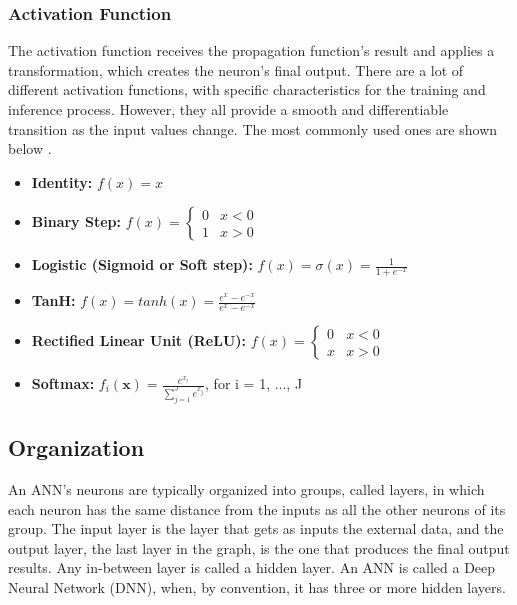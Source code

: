\subsubsection{Activation Function}
The activation function receives the propagation function's result and applies a transformation, which creates the neuron's final output. There are a lot of different activation functions, with specific characteristics for the training and inference process. However, they all provide a smooth and differentiable transition as the input values change. The most commonly used ones are shown below \cite{Activation-Function-Wikipedia}.
\begin{itemize}
	\item \textbf{Identity:} $f(x) = x$

	\item \textbf{Binary Step:} $
		      f(x) =
		      \begin{cases}
			      0 & x < 0 \\
			      1 & x > 0
		      \end{cases}
	      $

	\item \textbf{Logistic (Sigmoid or Soft step):} $
		      f(x) = \sigma(x) = \frac{1}{1 + e^{-x}}
	      $

	\item \textbf{TanH:} $
		      f(x) = tanh(x) = \frac{e^{x} - e^{-x}}{e^{x} - e^{-x}}
	      $

	\item \textbf{Rectified Linear Unit (ReLU):} $
		      f(x) =
		      \begin{cases}
			      0 & x < 0 \\
			      x & x > 0
		      \end{cases}
	      $

	\item \textbf{Softmax:} $
		      f_i(\textbf{x}) = \frac{
		      e^{x_i}
		      }{
		      \sum_{j=1}^{J}e^{x_j}
		      }
	      $, for i = 1, ..., J
\end{itemize}

\subsection{Organization}
An ANN's neurons are typically organized into groups, called layers, in which each neuron has the same distance from the inputs as all the other neurons of its group. The input layer is the layer that gets as inputs the external data, and the output layer, the last layer in the graph, is the one that produces the final output results. Any in-between layer is called a hidden layer. An ANN is called a Deep Neural Network (DNN), when, by convention, it has three or more hidden layers.

